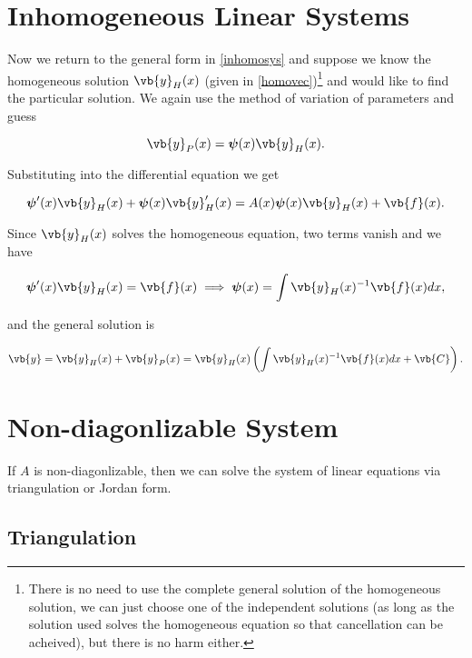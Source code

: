 \documentclass[english,a4paper,12pt]{report}
\begin{document}
\section{Inhomogeneous Linear Systems}

Now we return to the general form in \cref{inhomosys} and suppose we know the homogeneous solution \(\vb{y} _{H}(x) \) (given in \cref{homovec})\footnote{There is no need to use the complete general solution of the homogeneous solution, we can just choose one of the independent solutions (as long as the solution used solves the homogeneous equation so that cancellation can be acheived), but there is no harm either.} and would like to find the particular solution. We again use the method of variation of parameters and guess 

\begin{equation}
    \vb{y} _{P}(x) = \boldsymbol{\psi }(x) \vb{y} _{H}(x).  
\end{equation}

Substituting into the differential equation we get

\begin{equation}
    \boldsymbol{\psi }'(x)\vb{y} _{H}(x) + \boldsymbol{\psi }(x) \vb{y} _{H}'(x) = A(x) \boldsymbol{\psi }(x) \vb{y} _{H}(x) + \vb{f} (x).
\end{equation}

Since \(\vb{y} _{H}(x)  \) solves the homogeneous equation, two terms vanish and we have

\begin{equation}
    \boldsymbol{\psi }'(x)\vb{y} _{H}(x) = \vb{f} (x) \implies  \boldsymbol{\psi }(x) = \int \vb{y} _{H} (x)^{-1} \vb{f} (x) dx,
\end{equation}

and the general solution is 

\begin{equation}
    \vb{y} = \vb{y} _{H}(x) + \vb{y} _{P}(x) = \vb{y} _{H}(x) \left( \int \vb{y} _{H} (x)^{-1} \vb{f} (x) dx + \vb{C}  \right).
\end{equation}

\section{Non-diagonlizable System}

If \(A\) is non-diagonlizable, then we can solve the system of linear equations via triangulation or Jordan form.

\subsection{Triangulation}
\end{document}
